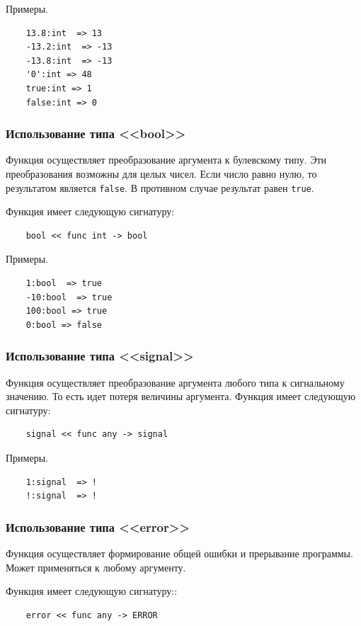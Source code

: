 Примеры.
\begin{verbatim}
    13.8:int  => 13
    -13.2:int  => -13
    -13.8:int  => -13
    '0':int => 48
    true:int => 1
    false:int => 0
\end{verbatim}

\subsubsection{Использование типа <<bool>>}

Функция осуществляет преобразование аргумента к булевскому типу. Эти преобразования возможны для целых чисел. Если число равно нулю, то результатом является \verb|false|. В противном случае результат равен \verb|true|.

Функция имеет следующую сигнатуру:
\begin{verbatim}
    bool << func int -> bool
\end{verbatim}

Примеры.
\begin{verbatim}
    1:bool  => true
    -10:bool  => true
    100:bool => true
    0:bool => false
\end{verbatim}

\subsubsection{Использование типа <<signal>>}

Функция осуществляет преобразование аргумента любого типа к сигнальному значению. То есть идет потеря величины аргумента.
Функция имеет следующую сигнатуру:
\begin{verbatim}
    signal << func any -> signal
\end{verbatim}

Примеры.
\begin{verbatim}
    1:signal  => !
    !:signal  => !
\end{verbatim}

\subsubsection{Использование типа <<error>>}

Функция осуществляет формирование общей ошибки и прерывание программы. Может применяться к любому аргументу.

Функция имеет следующую сигнатуру::
\begin{verbatim}
    error << func any -> ERROR
\end{verbatim}

